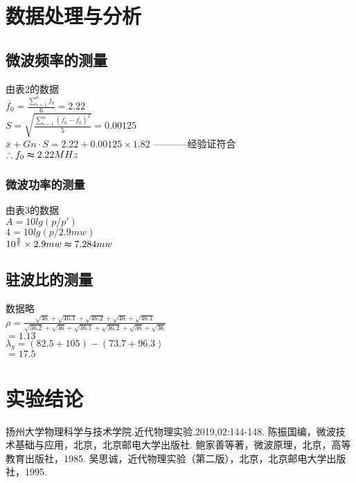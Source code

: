 \documentclass{hfutpaper}
\newcommand{\upcite}[1]{\textsuperscript{\textsuperscript{\cite{#1}}}}
\begin{document}
\section{数据处理与分析}
\subsection{微波频率的测量}
由表2的数据\\
$\overline{f_{0}}=\frac{\sum_{i=1}^{6}f_{0}}{6}=2.22$\\
$S=\sqrt{\frac{\sum_{i=1}^6(f_{0}-\overline{f_{0}})^2}{5}}=0.00125$\\
$\overline{x}+Gn\cdot S=2.22+0.00125\times 1.82$ -----------经验证符合\\
$\therefore f_{0}\thickapprox 2.22 MHz$\\
\subsubsection{微波功率的测量}
由表3的数据\\
$A=10lg(p/p')$\\
$4=10lg(p/2.9mw)$\\
$10^{\frac{2}{5}}\times 2.9mw \thickapprox 7.284 mw$\\
\subsection{驻波比的测量}
数据略\\
$\rho=\frac{\sqrt{46}+\sqrt{46.1}+\sqrt{46.2}+\sqrt{46}+\sqrt{46.1}}{\sqrt{36.2}+\sqrt{36}+\sqrt{36.1}+\sqrt{36.2}+\sqrt{36}+\sqrt{36}}$\\
$=1.13$\\
$\lambda_{g}=(82.5+105)-(73.7+96.3)$\\
$=17.5$\\
\section{实验结论}
\begin{thebibliography}{9}%
 扬州大学物理科学与技术学院.近代物理实验.2019,02:144-148\upcite{bib:one}.
 陈振国编，微波技术基础与应用，北京，北京邮电大学出版社\upcite{bib:two}. 
 鲍家善等著，微波原理，北京，高等教育出版社，1985\upcite{bib:three}.
吴思诚，近代物理实验（第二版），北京，北京邮电大学出版社，1995\upcite{bib:four}.
\end{thebibliography}
\end{document}
